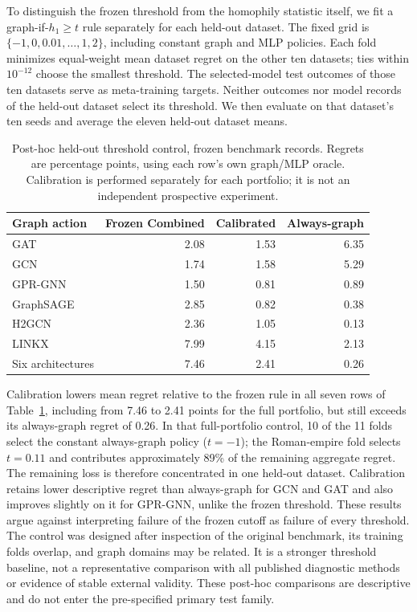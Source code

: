 To distinguish the frozen threshold from the homophily statistic itself, we fit a graph-if-$h_1\geq t$ rule separately for each held-out dataset. The fixed grid is $\{-1,0,0.01,\ldots,1,2\}$, including constant graph and MLP policies. Each fold minimizes equal-weight mean dataset regret on the other ten datasets; ties within $10^{-12}$ choose the smallest threshold. The selected-model test outcomes of those ten datasets serve as meta-training targets. Neither outcomes nor model records of the held-out dataset select its threshold. We then evaluate on that dataset's ten seeds and average the eleven held-out dataset means.

\begin{table}[t]
\centering
\caption{Post-hoc held-out threshold control, frozen benchmark records. Regrets are percentage points, using each row's own graph/MLP oracle. Calibration is performed separately for each portfolio; it is not an independent prospective experiment.}
\label{tab:calibrated_threshold}
\small
\begin{tabular}{@{}lrrr@{}}
\toprule
Graph action & Frozen Combined & Calibrated & Always-graph \\
\midrule
GAT & 2.08 & 1.53 & 6.35 \\
GCN & 1.74 & 1.58 & 5.29 \\
GPR-GNN & 1.50 & 0.81 & 0.89 \\
GraphSAGE & 2.85 & 0.82 & 0.38 \\
H2GCN & 2.36 & 1.05 & 0.13 \\
LINKX & 7.99 & 4.15 & 2.13 \\
Six architectures & 7.46 & 2.41 & 0.26 \\
\bottomrule
\end{tabular}
\end{table}

Calibration lowers mean regret relative to the frozen rule in all seven rows of Table~\ref{tab:calibrated_threshold}, including from 7.46 to 2.41 points for the full portfolio, but still exceeds its always-graph regret of 0.26. In that full-portfolio control, 10 of the 11 folds select the constant always-graph policy ($t=-1$); the Roman-empire fold selects $t=0.11$ and contributes approximately 89\% of the remaining aggregate regret. The remaining loss is therefore concentrated in one held-out dataset. Calibration retains lower descriptive regret than always-graph for GCN and GAT and also improves slightly on it for GPR-GNN, unlike the frozen threshold. These results argue against interpreting failure of the frozen cutoff as failure of every threshold. The control was designed after inspection of the original benchmark, its training folds overlap, and graph domains may be related. It is a stronger threshold baseline, not a representative comparison with all published diagnostic methods or evidence of stable external validity. These post-hoc comparisons are descriptive and do not enter the pre-specified primary test family.

